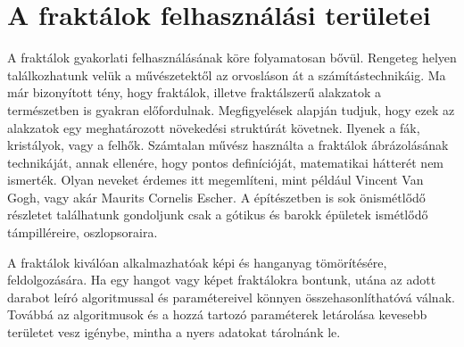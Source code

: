 \section*{A fraktálok felhasználási területei}
A fraktálok gyakorlati felhasználásának köre folyamatosan bővül. Rengeteg helyen találkozhatunk velük a művészetektől az orvosláson át a számítástechnikáig. Ma már bizonyított tény, hogy fraktálok, illetve fraktálszerű alakzatok a természetben is gyakran előfordulnak. Megfigyelések alapján tudjuk, hogy ezek az alakzatok egy meghatározott növekedési struktúrát követnek. Ilyenek a fák, kristályok, vagy a felhők. Számtalan művész használta a fraktálok ábrázolásának technikáját, annak ellenére, hogy pontos definícióját, matematikai hátterét nem ismerték.
Olyan neveket érdemes itt megemlíteni, mint például Vincent Van Gogh, vagy akár Maurits Cornelis Escher. A építészetben is sok önismétlődő részletet találhatunk gondoljunk csak a gótikus és barokk épületek ismétlődő támpilléreire, oszlopsoraira. \cite{alkalmazas}
\par A fraktálok kiválóan alkalmazhatóak képi és hanganyag tömörítésére, feldolgozására. Ha egy hangot vagy képet fraktálokra bontunk, utána az adott darabot leíró algoritmussal és paramétereivel könnyen összehasonlíthatóvá válnak. Továbbá az algoritmusok és a hozzá tartozó paraméterek letárolása kevesebb területet vesz igénybe, mintha a nyers adatokat tárolnánk le. \cite{alkalmazas}